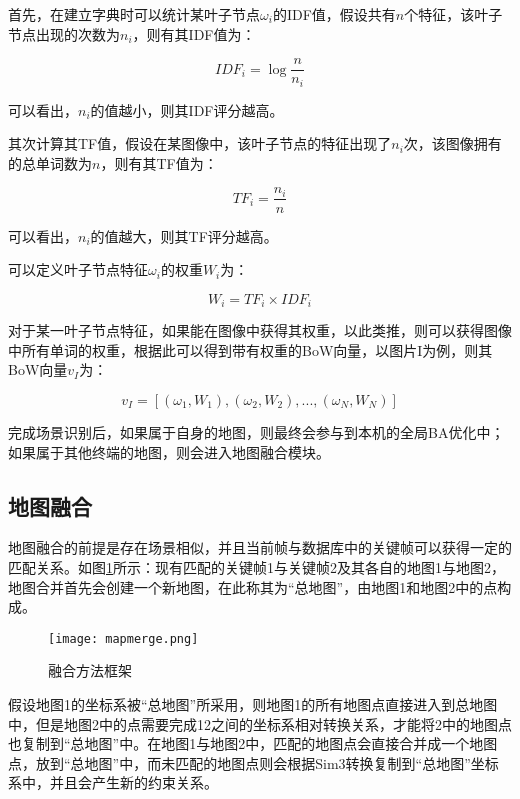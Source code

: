 首先，在建立字典时可以统计某叶子节点$\omega_i$的IDF值，假设共有$n$个特征，该叶子节点出现的次数为$n_i$，则有其IDF值为：

\begin{equation}
IDF_i=\log{\frac{n}{n_i}}
\end{equation}

可以看出，$n_i$的值越小，则其IDF评分越高。

其次计算其TF值，假设在某图像中，该叶子节点的特征出现了$n_i$次，该图像拥有的总单词数为$n$，则有其TF值为：

\begin{equation}
TF_i=\frac{n_i}{n}
\end{equation}

可以看出，$n_i$的值越大，则其TF评分越高。

可以定义叶子节点特征$\omega_i$的权重$W_i$为：

\begin{equation}
W_i = TF_i \times IDF_i
\end{equation}

对于某一叶子节点特征，如果能在图像中获得其权重，以此类推，则可以获得图像中所有单词的权重，根据此可以得到带有权重的BoW向量，以图片I为例，则其BoW向量$v_I$为：

\begin{equation}
v_I = [(\omega_1, W_1), (\omega_2, W_2), ... , (\omega_N, W_N)]
\end{equation}

完成场景识别后，如果属于自身的地图，则最终会参与到本机的全局BA优化中；如果属于其他终端的地图，则会进入地图融合模块。


\subsection{地图融合} \label{3.4.2}

地图融合的前提是存在场景相似，并且当前帧与数据库中的关键帧可以获得一定的匹配关系。如图\ref{fig-mapmerge}所示：现有匹配的关键帧1与关键帧2及其各自的地图1与地图2，地图合并首先会创建一个新地图，在此称其为“总地图”，由地图1和地图2中的点构成。

\begin{figure}[!ht]
	\centering
	\texttt{[image: mapmerge.png]}
	\caption{融合方法框架}
	\label{fig-mapmerge}
\end{figure}

假设地图1的坐标系被“总地图”所采用，则地图1的所有地图点直接进入到总地图中，但是地图2中的点需要完成12之间的坐标系相对转换关系，才能将2中的地图点也复制到“总地图”中。在地图1与地图2中，匹配的地图点会直接合并成一个地图点，放到“总地图”中，而未匹配的地图点则会根据Sim3转换复制到“总地图”坐标系中，并且会产生新的约束关系。

